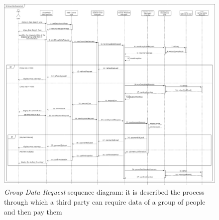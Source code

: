 \begin{figure}[H]
  \begin{center}
  	\includegraphics[width=\textwidth]{./img/sequence/groupDataRequest.png}
    \hspace{0.05\linewidth}
    \centering
    \caption{\textit{Group Data Request} sequence diagram: it is described the process through which a third party can require data of a group of people and then pay them}
		\label{img:groupDataRequest}
    \end{center}
\end{figure}

